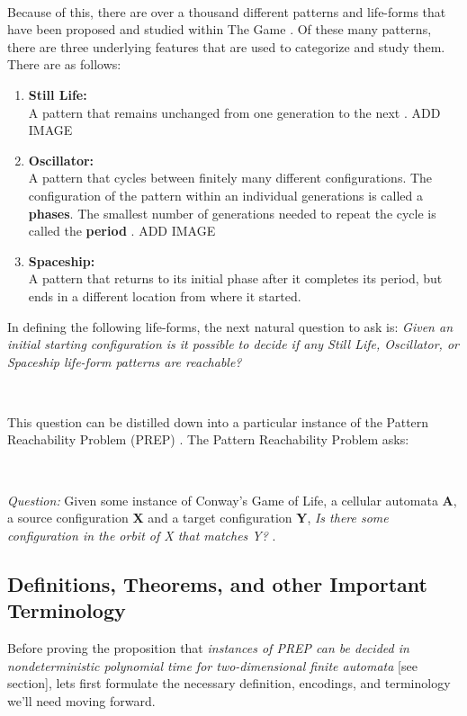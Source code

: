 \documentclass{article}
\theoremstyle{definition}
\theoremstyle{plain}
\theoremstyle{plain}
\begin{document}
\

Because of this, there are over a thousand different patterns and life-forms that have been proposed and studied within The Game \cite{Life_Wiki}. Of these many patterns, there are three underlying features that are used to categorize and study them. There are as follows: 

\begin{enumerate}
  \item \textbf{Still Life: } \\ A pattern that remains unchanged from one generation to the next \cite{JG2022conway}. ADD IMAGE
  \item \textbf{Oscillator: } \\ A pattern that cycles between finitely many different configurations. The configuration of the pattern within an individual generations is called a \textbf{phases}. The smallest number of generations needed to repeat the cycle is called the \textbf{period} \cite{JG2022conway}. ADD IMAGE
  \item \textbf{Spaceship: } \\ A pattern that returns to its initial phase after it completes its period, but ends in a different location from where it started. \cite{JG2022conway}
\end{enumerate}

In defining the following life-forms, the next natural question to ask is: \textit{Given an initial starting configuration is it possible to decide if any Still Life, Oscillator, or Spaceship life-form patterns are reachable?}

\

This question can be distilled down into a particular instance of the Pattern Reachability Problem (PREP) \cite{SUTNER199587}. The Pattern Reachability Problem asks: 

 \

 \textit{Question: } Given some instance of Conway's Game of Life, a cellular automata \textbf{A}, a source configuration \textbf{X} and a target configuration \textbf{Y}, \textit{Is there some configuration in the orbit of X that matches Y?} \cite{SUTNER199587}.

\subsection{Definitions, Theorems, and other Important Terminology}
Before proving the proposition that 
\textit {instances of PREP can be decided in nondeterministic polynomial time for two-dimensional finite automata} [see section], lets first formulate the necessary definition, encodings, and terminology we'll need moving forward.
\end{document}
